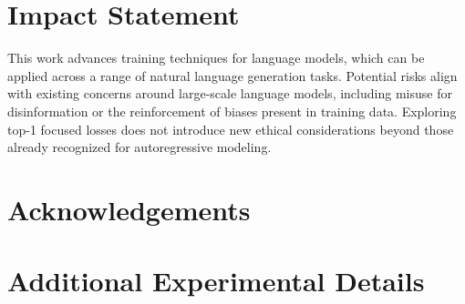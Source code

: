 \documentclass{article}
\begin{document}
\section*{Impact Statement}
This work advances training techniques for language models, which can be applied across a range of natural language generation tasks.
Potential risks align with existing concerns around large-scale language models, including misuse for disinformation or the reinforcement of biases present in training data.
Exploring top-1 focused losses does not introduce new ethical considerations beyond those already recognized for autoregressive modeling.

\section*{Acknowledgements}




\appendix
\onecolumn
\section{Additional Experimental Details}
\end{document}
